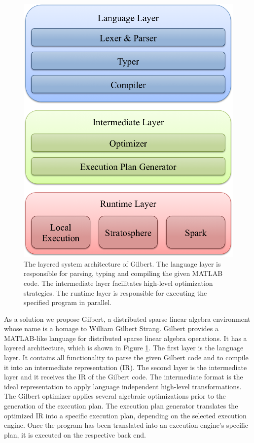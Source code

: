 \begin{figure}[t!]
\centering
\includegraphics[height=0.175\paperheight]{images/systemArchitecture.png}
\caption{The layered system architecture of Gilbert. The language layer is responsible for parsing, typing and compiling the given MATLAB code. The intermediate layer facilitates high-level optimization strategies. The runtime layer is responsible for executing the specified program in parallel.}
\label{fig:systemArchitecture}
\end{figure}

As a solution we propose Gilbert, a distributed sparse linear algebra environment whose name is a homage to William Gilbert Strang.
Gilbert provides a MATLAB-like language for distributed sparse linear algebra operations. It has a layered architecture, which is shown in Figure \ref{fig:systemArchitecture}. The first layer is the language layer. It contains all functionality to parse the given Gilbert code and to compile it into an intermediate representation (IR). The second layer is the intermediate layer and it receives the IR of the Gilbert code. The intermediate format is the ideal representation to apply language independent high-level transformations. The Gilbert optimizer applies several algebraic optimizations prior to the generation of the execution plan. The execution plan generator translates the optimized IR into a specific execution plan, depending on the selected execution engine. Once the program has been translated into an execution engine's specific plan, it is executed on the respective back end. 

